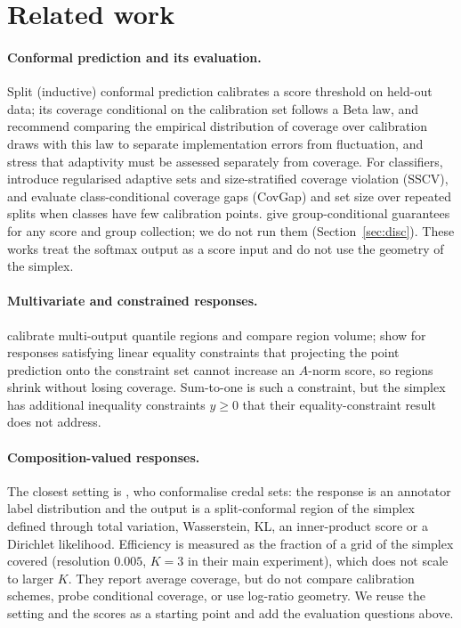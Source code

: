 \section{Related work}\label{sec:related}
\paragraph{Conformal prediction and its evaluation.} Split (inductive) conformal prediction calibrates a score threshold on held-out data; its coverage conditional on the calibration set follows a Beta law, and \citet{angelopoulos2021gentle} recommend comparing the empirical distribution of coverage over calibration draws with this law to separate implementation errors from fluctuation, and stress that adaptivity must be assessed separately from coverage. For classifiers, \citet{angelopoulos2021raps} introduce regularised adaptive sets and size-stratified coverage violation (SSCV), and \citet{ding2023clustered} evaluate class-conditional coverage gaps (CovGap) and set size over repeated splits when classes have few calibration points. \citet{jung2023batch} give group-conditional guarantees for any score and group collection; we do not run them (Section~\ref{sec:disc}). These works treat the softmax output as a score input and do not use the geometry of the simplex.

\paragraph{Multivariate and constrained responses.} \citet{feldman2023calibrated} calibrate multi-output quantile regions and compare region volume; \citet{principato2024hierarchical} show for responses satisfying linear equality constraints that projecting the point prediction onto the constraint set cannot increase an $A$-norm score, so regions shrink without losing coverage. Sum-to-one is such a constraint, but the simplex has additional inequality constraints $y\ge0$ that their equality-constraint result does not address.

\paragraph{Composition-valued responses.} The closest setting is \citet{javanmardi2024credal}, who conformalise credal sets: the response is an annotator label distribution and the output is a split-conformal region of the simplex defined through total variation, Wasserstein, KL, an inner-product score or a Dirichlet likelihood. Efficiency is measured as the fraction of a grid of the simplex covered (resolution $0.005$, $K=3$ in their main experiment), which does not scale to larger $K$. They report average coverage, but do not compare calibration schemes, probe conditional coverage, or use log-ratio geometry. We reuse the setting and the scores as a starting point and add the evaluation questions above.

